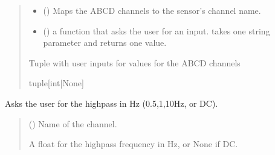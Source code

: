 \documentclass[letterpaper,10pt,english]{sphinxmanual}
\begin{document}
\begin{fulllineitems}
\begin{fulllineitems}
\begin{quote}
\begin{description}
\begin{itemize}
\item {} 
\sphinxAtStartPar
{} (\sphinxstyleliteralemphasis{\sphinxupquote{{[}}}\sphinxstyleliteralemphasis{\sphinxupquote{,}}\sphinxstyleliteralemphasis{\sphinxupquote{{]}}}) \textendash{} Maps the ABCD channels to the sensor’s channel name.

\item {} 
\sphinxAtStartPar
{} () \textendash{} a function that asks the user for an input. takes one string                 parameter and returns one value.

\end{itemize}

\sphinxAtStartPar
Tuple with user inputs for values for the ABCD channels

\sphinxAtStartPar
tuple{[}int|None{]}

\end{description}\end{quote}

\end{fulllineitems}


\begin{fulllineitems}
\label{\detokenize{Setup_8401HR:Setup_8401HR.Setup_8401HR._SetHighpass}}
\pysigstartsignatures
{}
\pysigstopsignatures
\sphinxAtStartPar
Asks the user for the high\sphinxhyphen{}pass in Hz (0.5,1,10Hz, or DC).
\begin{quote}\begin{description}
\sphinxAtStartPar
{} () \textendash{} Name of the channel.

\sphinxAtStartPar
A float for the high\sphinxhyphen{}pass frequency in Hz, or None if DC.


\end{description}
\end{quote}
\end{fulllineitems}
\end{fulllineitems}
\end{document}
